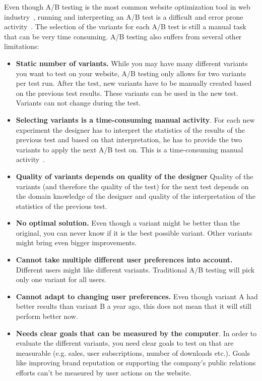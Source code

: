 \documentclass{report}
\begin{document}
Even though A/B testing is the most common website optimization tool in web industry~\cite{kohavi2007practical, kohavi2013online}, running and interpreting an A/B test is a difficult and error prone activity~\cite{crook2009seven}. The selection of the variants for each A/B test is still a manual task that can be very time consuming. A/B testing also suffers from several other limitations:

\begin{itemize}
	\item \textbf{Static number of variants.} While you may have many different variants you want to test on your website, A/B testing only allows for two variants per test run. After the test, new variants have to be manually created based on the previous test results. These variants can be used in the new test. Variants can not change during the test.
	\item \textbf{Selecting variants is a time-consuming manual activity}. For each new experiment the designer has to interpret the statistics of the results of the previous test and based on that interpretation, he has to provide the two variants to apply the next A/B test on. This is a time-consuming manual activity~\cite{crook2009seven}.
	\item \textbf{Quality of variants depends on quality of the designer} Quality of the variants (and therefore the quality of the test) for the next test depends on the domain knowledge of the designer and quality of the interpretation of the statistics of the previous test.
	\item \textbf{No optimal solution.} Even though a variant might be better than the original, you can never know if it is the best possible variant. Other variants might bring even bigger improvements.
	\item \textbf{Cannot take multiple different user preferences into account.} Different users might like different variants. Traditional A/B testing will pick only one variant for all users.
	\item \textbf{Cannot adapt to changing user preferences.} Even though variant A had better results than variant B a year ago, this does not mean that it will still perform better now.
	\item \textbf{Needs clear goals that can be measured by the computer}. In order to evaluate the different variants, you need clear goals to test on that are measurable (e.g. sales, user subscriptions, number of downloads etc.). Goals like improving brand reputation or supporting the company's public relations efforts can't be measured by user actions on the website.

\end{itemize}
\end{document}
